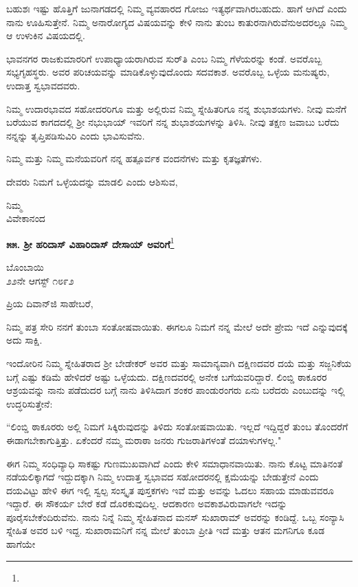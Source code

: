 ಬಹುಶಃ ಇಷ್ಟು ಹೊತ್ತಿಗೆ ಜುನಾಗಡದಲ್ಲಿ ನಿಮ್ಮ ವ್ಯವಹಾರದ ಗೋಜು ಇತ್ಯರ್ಥವಾಗಿರಬಹುದು. ಹಾಗೆ ಆಗಿದೆ ಎಂದು ನಾನು ಊಹಿಸುತ್ತೇನೆ. ನಿಮ್ಮ ಅನಾರೋಗ್ಯದ ವಿಷಯವನ್ನು ಕೇಳಿ ನಾನು ತುಂಬ ಕಾತುರನಾಗಿರುವೆನು\enginline{-}ಅದರಲ್ಲೂ ನಿಮ್ಮ ಆ ಉಳುಕಿನ ವಿಷಯದಲ್ಲಿ.

ಭಾವನಗರ ರಾಜಕುಮಾರರಿಗೆ ಉಪಾಧ್ಯಾಯರಾಗಿರುವ ಸುರ್‌ತಿ ಎಂಬ ನಿಮ್ಮ ಗೆಳೆಯರನ್ನು ಕಂಡೆ. ಅವರೊಬ್ಬ ಸಭ್ಯಗೃಹಸ್ಥರು. ಅವರ ಪರಿಚಯವನ್ನು ಮಾಡಿಕೊಳ್ಳುವುದೊಂದು ಸದವಕಾಶ. ಅವರೊಬ್ಬ ಒಳ್ಳೆಯ ಮನುಷ್ಯರು, ಉದಾತ್ತ ಸ್ವಭಾವದವರು.

ನಿಮ್ಮ ಉದಾರಭಾವದ ಸಹೋದರರಿಗೂ ಮತ್ತು ಅಲ್ಲಿರುವ ನಿಮ್ಮ ಸ್ನೇಹಿತರಿಗೂ ನನ್ನ ಶುಭಾಶಯಗಳು. ನೀವು ಮನೆಗೆ ಬರೆಯುವ ಕಾಗದದಲ್ಲಿ ಶ‍್ರೀ ನಭುಭಾಯ್ ಇವರಿಗೆ ನನ್ನ ಶುಭಾಶಯಗಳನ್ನು ತಿಳಿಸಿ. ನೀವು ತಕ್ಷಣ ಜವಾಬು ಬರೆದು ನನ್ನನ್ನು ತೃಪ್ತಿಪಡಿಸುವಿರಿ ಎಂದು ಭಾವಿಸುವೆನು.

ನಿಮ್ಮ ಮತ್ತು ನಿಮ್ಮ ಮನೆಯವರಿಗೆ ನನ್ನ ಹತ್ಪೂರ್ವಕ ವಂದನೆಗಳು ಮತ್ತು ಕೃತಜ್ಞತೆಗಳು.

ದೇವರು ನಿಮಗೆ ಒಳ್ಳೆಯದನ್ನು ಮಾಡಲಿ ಎಂದು ಆಶಿಸುವ,

{\flushright
ನಿಮ್ಮ\\ವಿವೇಕಾನಂದ\par}

\begin{center}
\textbf{೫೫. ಶ‍್ರೀ ಹರಿದಾಸ್ ವಿಹಾರಿದಾಸ್ ದೇಸಾಯ್ ಅವರಿಗೆ}\footnote{}
\end{center}

\begin{flushright}
ಬೊಂಬಾಯಿ\\೨೨ನೇ ಆಗಸ್ಟ್ ೧೮೯೨
\end{flushright}

\noindent
ಪ್ರಿಯ ದಿವಾನ್‌ಜಿ ಸಾಹೇಬರೆ,

ನಿಮ್ಮ ಪತ್ರ ಸೇರಿ ನನಗೆ ತುಂಬಾ ಸಂತೋಷವಾಯಿತು. ಈಗಲೂ ನಿಮಗೆ ನನ್ನ ಮೇಲೆ ಅದೇ ಪ್ರೇಮ ಇದೆ ಎನ್ನುವುದಕ್ಕೆ ಅದು ಸಾಕ್ಷಿ.

ಇಂದೋರಿನ ನಿಮ್ಮ ಸ್ನೇಹಿತರಾದ ಶ‍್ರೀ ಬೇಡೇಕರ್‌ ಅವರ ಮತ್ತು ಸಾಮಾನ್ಯವಾಗಿ ದಕ್ಷಿಣದವರ ದಯೆ ಮತ್ತು ಸಜ್ಜನಿಕೆಯ ಬಗ್ಗೆ ಎಷ್ಟು ಕಡಿಮೆ ಹೇಳಿದರೆ ಅಷ್ಟು ಒಳ್ಳೆಯದು. ದಕ್ಷಿಣದವರಲ್ಲಿ ಅನೇಕ ಬಗೆಯವರಿದ್ದಾರೆ. ಲಿಂಬ್ಡಿ ಠಾಕೂರರ ಆಶ್ರಯವನ್ನು ನಾನು ಪಡೆದುದರ ಬಗ್ಗೆ ನಾನು ತಿಳಿಸಿದಾಗ ಶಂಕರ ಪಾಂಡುರಂಗರು ಏನು ಬರೆದರು ಎಂಬುದನ್ನು ಇಲ್ಲಿ ಉದ್ಧರಿಸುತ್ತೇನೆ:

``ಲಿಂಬ್ಡಿ ಠಾಕೂರರು ಅಲ್ಲಿ ನಿಮಗೆ ಸಿಕ್ಕಿರುವುದನ್ನು ತಿಳಿದು ಸಂತೋಷವಾಯಿತು. ಇಲ್ಲದೆ ಇದ್ದಿದ್ದರೆ ತುಂಬ ತೊಂದರೆಗೆ ಈಡಾಗಬೇಕಾಗುತ್ತಿತ್ತು. ಏಕೆಂದರೆ ನಮ್ಮ ಮರಾಠಾ ಜನರು ಗುಜರಾತಿಗಳಂತೆ ದಯಾಳುಗಳಲ್ಲ."

ಈಗ ನಿಮ್ಮ ಸಂಧಿವ್ಯಾಧಿ ಸಾಕಷ್ಟು ಗುಣಮುಖವಾಗಿದೆ ಎಂದು ಕೇಳಿ ಸಮಾಧಾನವಾಯಿತು. ನಾನು ಕೊಟ್ಟ ಮಾತಿನಂತೆ ನಡೆಯಲಿಕ್ಕಾಗದೆ ಇದ್ದುದಕ್ಕಾಗಿ ನಿಮ್ಮ ಉದಾತ್ತ ಸ್ವಭಾವದ ಸಹೋದರನಲ್ಲಿ ಕ್ಷಮೆಯನ್ನು ಬೇಡುತ್ತೇನೆ ಎಂದು ದಯವಿಟ್ಟು ಹೇಳಿ ಈಗ ಇಲ್ಲಿ ಸ್ವಲ್ಪ ಸಂಸ್ಕೃತ ಪುಸ್ತಕಗಳು ಇವೆ ಮತ್ತು ಅವನ್ನು ಓದಲು ಸಹಾಯ ಮಾಡುವವರೂ ಇದ್ದಾರೆ. ಈ ಸೌಕರ್ಯ ಬೇರೆ ಕಡೆ ದೊರಕುವುದಿಲ್ಲ. ಆದಕಾರಣ ಅವಕಾಶವಿರುವಾಗಲೇ ಇದನ್ನು ಪೂರೈಸಬೇಕೆಂದಿರುವೆನು. ನಾನು ನಿನ್ನೆ ನಿಮ್ಮ ಸ್ನೇಹಿತನಾದ ಮನಸ್ ಸುಖಾರಾಮ್ ಅವರನ್ನು ಕಂಡಿದ್ದೆ. ಒಬ್ಬ ಸಂನ್ಯಾಸಿ ಸ್ನೇಹಿತ ಅವರ ಬಳಿ ಇದ್ದ. ಸುಖಾರಾಮನಿಗೆ ನನ್ನ ಮೇಲೆ ತುಂಬಾ ಪ್ರೀತಿ ಇದೆ ಮತ್ತು ಆತನ ಮಗನಿಗೂ ಕೂಡ ಹಾಗೆಯೇ

